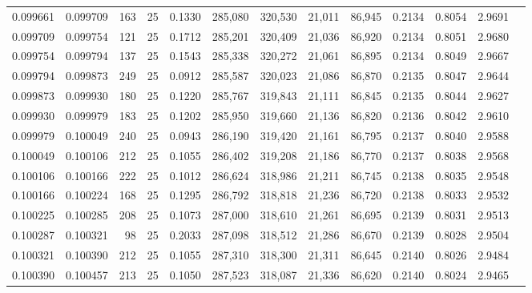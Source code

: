 \begin{tabular}{rrrrrrrrrrrrr}
0.099661 & 0.099709 &   163 &  25 &                                     0.1330 & 285,080 & 320,530 &  21,011 &  86,945 & 0.2134 & 0.8054 & 2.9691 \\
0.099709 & 0.099754 &   121 &  25 &                                     0.1712 & 285,201 & 320,409 &  21,036 &  86,920 & 0.2134 & 0.8051 & 2.9680 \\
0.099754 & 0.099794 &   137 &  25 &                                     0.1543 & 285,338 & 320,272 &  21,061 &  86,895 & 0.2134 & 0.8049 & 2.9667 \\
0.099794 & 0.099873 &   249 &  25 &                                     0.0912 & 285,587 & 320,023 &  21,086 &  86,870 & 0.2135 & 0.8047 & 2.9644 \\
0.099873 & 0.099930 &   180 &  25 &                                     0.1220 & 285,767 & 319,843 &  21,111 &  86,845 & 0.2135 & 0.8044 & 2.9627 \\
0.099930 & 0.099979 &   183 &  25 &                                     0.1202 & 285,950 & 319,660 &  21,136 &  86,820 & 0.2136 & 0.8042 & 2.9610 \\
0.099979 & 0.100049 &   240 &  25 &                                     0.0943 & 286,190 & 319,420 &  21,161 &  86,795 & 0.2137 & 0.8040 & 2.9588 \\
0.100049 & 0.100106 &   212 &  25 &                                     0.1055 & 286,402 & 319,208 &  21,186 &  86,770 & 0.2137 & 0.8038 & 2.9568 \\
0.100106 & 0.100166 &   222 &  25 &                                     0.1012 & 286,624 & 318,986 &  21,211 &  86,745 & 0.2138 & 0.8035 & 2.9548 \\
0.100166 & 0.100224 &   168 &  25 &                                     0.1295 & 286,792 & 318,818 &  21,236 &  86,720 & 0.2138 & 0.8033 & 2.9532 \\
0.100225 & 0.100285 &   208 &  25 &                                     0.1073 & 287,000 & 318,610 &  21,261 &  86,695 & 0.2139 & 0.8031 & 2.9513 \\
0.100287 & 0.100321 &    98 &  25 &                                     0.2033 & 287,098 & 318,512 &  21,286 &  86,670 & 0.2139 & 0.8028 & 2.9504 \\
0.100321 & 0.100390 &   212 &  25 &                                     0.1055 & 287,310 & 318,300 &  21,311 &  86,645 & 0.2140 & 0.8026 & 2.9484 \\
0.100390 & 0.100457 &   213 &  25 &                                     0.1050 & 287,523 & 318,087 &  21,336 &  86,620 & 0.2140 & 0.8024 & 2.9465 \\

\end{tabular}
